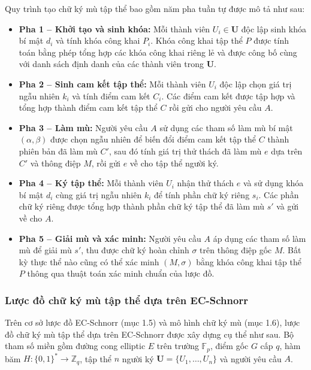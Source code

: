 Quy trình tạo chữ ký mù tập thể bao gồm năm pha tuần tự được mô tả như sau:

\begin{itemize}
    \item \textbf{Pha 1 -- Khởi tạo và sinh khóa:} Mỗi thành viên $U_i \in \mathbf{U}$ độc lập sinh khóa bí mật $d_i$ và tính khóa công khai $P_i$. Khóa công khai tập thể $P$ được tính toán bằng phép tổng hợp các khóa công khai riêng lẻ và được công bố cùng với danh sách định danh của các thành viên trong $\mathbf{U}$.

    \item \textbf{Pha 2 -- Sinh cam kết tập thể:} Mỗi thành viên $U_i$ độc lập chọn giá trị ngẫu nhiên $k_i$ và tính điểm cam kết $C_i$. Các điểm cam kết được tập hợp và tổng hợp thành điểm cam kết tập thể $C$ rồi gửi cho người yêu cầu $A$.

    \item \textbf{Pha 3 -- Làm mù:} Người yêu cầu $A$ sử dụng các tham số làm mù bí mật $(\alpha, \beta)$ được chọn ngẫu nhiên để biến đổi điểm cam kết tập thể $C$ thành phiên bản đã làm mù $C'$, sau đó tính giá trị thử thách đã làm mù $e$ dựa trên $C'$ và thông điệp $M$, rồi gửi $e$ về cho tập thể người ký.

    \item \textbf{Pha 4 -- Ký tập thể:} Mỗi thành viên $U_i$ nhận thử thách $e$ và sử dụng khóa bí mật $d_i$ cùng giá trị ngẫu nhiên $k_i$ để tính phần chữ ký riêng $s_i$. Các phần chữ ký riêng được tổng hợp thành phần chữ ký tập thể đã làm mù $s'$ và gửi về cho $A$.

    \item \textbf{Pha 5 -- Giải mù và xác minh:} Người yêu cầu $A$ áp dụng các tham số làm mù để giải mù $s'$, thu được chữ ký hoàn chỉnh $\sigma$ trên thông điệp gốc $M$. Bất kỳ thực thể nào cũng có thể xác minh $(M, \sigma)$ bằng khóa công khai tập thể $P$ thông qua thuật toán xác minh chuẩn của lược đồ.
\end{itemize}

\subsubsection{Lược đồ chữ ký mù tập thể dựa trên EC-Schnorr}

Trên cơ sở lược đồ EC-Schnorr (mục 1.5) và mô hình chữ ký mù (mục 1.6), lược đồ chữ ký mù tập thể dựa trên EC-Schnorr được xây dựng cụ thể như sau. Bộ tham số miền gồm đường cong elliptic $E$ trên trường $\mathbb{F}_p$, điểm gốc $G$ cấp $q$, hàm băm $H: \{0,1\}^* \rightarrow \mathbb{Z}_q$, tập thể $n$ người ký $\mathbf{U} = \{U_1, \ldots, U_n\}$ và người yêu cầu $A$.


